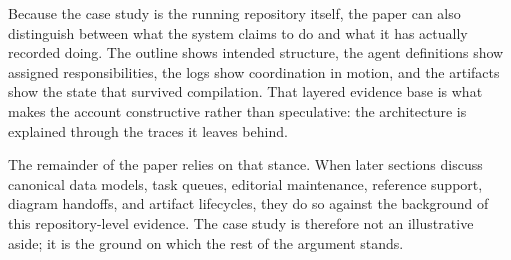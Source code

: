 Because the case study is the running repository itself, the paper can also distinguish between what the system claims to do and what it has actually recorded doing. The outline shows intended structure, the agent definitions show assigned responsibilities, the logs show coordination in motion, and the artifacts show the state that survived compilation. That layered evidence base is what makes the account constructive rather than speculative: the architecture is explained through the traces it leaves behind.

The remainder of the paper relies on that stance. When later sections discuss canonical data models, task queues, editorial maintenance, reference support, diagram handoffs, and artifact lifecycles, they do so against the background of this repository-level evidence. The case study is therefore not an illustrative aside; it is the ground on which the rest of the argument stands.
